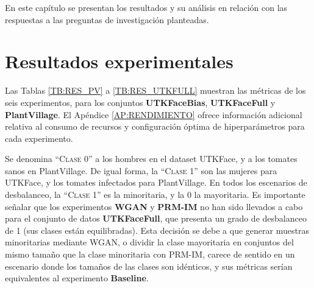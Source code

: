 En este capítulo se presentan los resultados y su análisis en relación con las respuestas a las preguntas de investigación planteadas.

\section{Resultados experimentales\label{SEC:TABLAS}}

Las Tablas \ref{TB:RES_PV} a \ref{TB:RES_UTKFULL} muestran las métricas de los seis experimentos, para los conjuntos \textbf{UTKFaceBias}, \textbf{UTKFaceFull} y \textbf{PlantVillage}. El Apéndice \ref{AP:RENDIMIENTO} ofrece información adicional relativa al consumo de recursos y configuración óptima de hiperparámetros para cada experimento.

Se denomina ``\textsc{Clase 0}'' a los hombres en el dataset UTKFace, y a los tomates sanos en PlantVillage. De igual forma, la ``\textsc{Clase 1}'' son las mujeres para UTKFace, y los tomates infectados para PlantVillage. En todos los escenarios de desbalanceo, la ``\textsc{Clase 1}'' es la minoritaria, y la 0 la mayoritaria. Es importante señalar que los experimentos \textbf{WGAN} y \textbf{PRM-IM} no han sido llevados a cabo para el conjunto de datos \textbf{UTKFaceFull}, que presenta un grado de desbalanceo de 1 (sus clases están equilibradas). Esta decisión se debe a que generar muestras minoritarias mediante WGAN, o dividir la clase mayoritaria en conjuntos del mismo tamaño que la clase minoritaria con PRM-IM, carece de sentido en un escenario donde los tamaños de las clases son idénticos, y sus métricas serían equivalentes al experimento \textbf{Baseline}.

